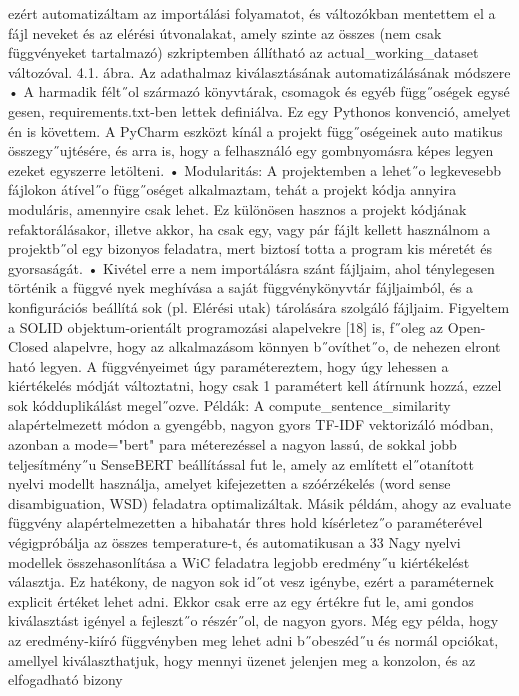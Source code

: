 \documentclass[12pt]{report}
\theoremstyle{definition}
\begin{document}
 ezért automatizáltam az importálási folyamatot, és változókban mentettem el a fájl
neveket és az elérési útvonalakat, amely szinte az összes (nem csak függvényeket
 tartalmazó) szkriptemben állítható az actual_working_dataset változóval.
 4.1. ábra. Az adathalmaz kiválasztásának automatizálásának módszere
 • A harmadik félt˝ol származó könyvtárak, csomagok és egyéb függ˝oségek egysé
gesen, requirements.txt-ben lettek definiálva. Ez egy Pythonos konvenció,
 amelyet én is követtem. A PyCharm eszközt kínál a projekt függ˝oségeinek auto
matikus összegy˝ujtésére, és arra is, hogy a felhasználó egy gombnyomásra képes
 legyen ezeket egyszerre letölteni.
 • Modularitás: A projektemben a lehet˝o legkevesebb fájlokon átível˝o függ˝oséget
 alkalmaztam, tehát a projekt kódja annyira moduláris, amennyire csak lehet. Ez
 különösen hasznos a projekt kódjának refaktorálásakor, illetve akkor, ha csak egy,
 vagy pár fájlt kellett használnom a projektb˝ol egy bizonyos feladatra, mert biztosí
totta a program kis méretét és gyorsaságát.
 • Kivétel erre a nem importálásra szánt fájljaim, ahol ténylegesen történik a függvé
nyek meghívása a saját függvénykönyvtár fájljaimból, és a konfigurációs beállítá
sok (pl. Elérési utak) tárolására szolgáló fájljaim.
 Figyeltem a SOLID objektum-orientált programozási alapelvekre [18] is, f˝oleg az
 Open-Closed alapelvre, hogy az alkalmazásom könnyen b˝ovíthet˝o, de nehezen elront
ható legyen. A függvényeimet úgy paramétereztem, hogy úgy lehessen a kiértékelés
 módját változtatni, hogy csak 1 paramétert kell átírnunk hozzá, ezzel sok kódduplikálást
 megel˝ozve. Példák: A compute_sentence_similarity alapértelmezett módon a
 gyengébb, nagyon gyors TF-IDF vektorizáló módban, azonban a mode="bert" para
méterezéssel a nagyon lassú, de sokkal jobb teljesítmény˝u SenseBERT beállítással fut le,
 amely az említett el˝otanított nyelvi modellt használja, amelyet kifejezetten a szóérzékelés
 (word sense disambiguation, WSD) feladatra optimalizáltak.
 Másik példám, ahogy az evaluate függvény alapértelmezetten a hibahatár thres
hold kísérletez˝o paraméterével végigpróbálja az összes temperature-t, és automatikusan a
 33
Nagy nyelvi modellek összehasonlítása a WiC feladatra
 legjobb eredmény˝u kiértékelést választja. Ez hatékony, de nagyon sok id˝ot vesz igénybe,
 ezért a paraméternek explicit értéket lehet adni. Ekkor csak erre az egy értékre fut le, ami
 gondos kiválasztást igényel a fejleszt˝o részér˝ol, de nagyon gyors. Még egy példa, hogy
 az eredmény-kiíró függvényben meg lehet adni b˝obeszéd˝u és normál opciókat, amellyel
 kiválaszthatjuk, hogy mennyi üzenet jelenjen meg a konzolon, és az elfogadható bizony
\end{document}
